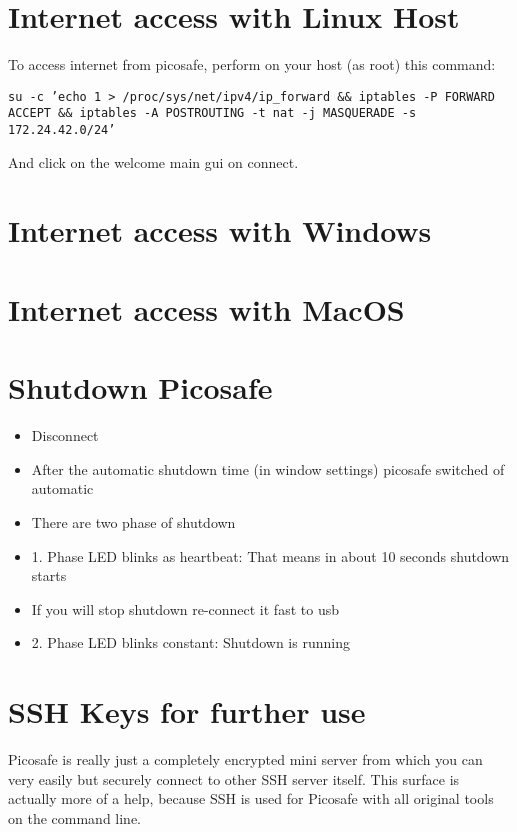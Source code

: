 \section{Internet access with Linux Host}

To access internet from picosafe, perform on your host (as root) this command:

\texttt{su -c 'echo 1 > /proc/sys/net/ipv4/ip\_forward \&\& iptables -P FORWARD ACCEPT \&\& iptables -A POSTROUTING -t nat -j MASQUERADE -s 172.24.42.0/24'}

And click on the welcome main gui on connect.

\section{Internet access with Windows}

\section{Internet access with MacOS}

\section{Shutdown Picosafe}
\begin{itemize}
\item Disconnect
\item After the automatic shutdown time (in window settings) picosafe switched of automatic
\item There are two phase of shutdown
\item 1. Phase LED blinks as heartbeat: That means in about 10 seconds shutdown starts
\item If you will stop shutdown re-connect it fast to usb
\item 2. Phase LED blinks constant: Shutdown is running
\end{itemize}



\section{SSH Keys for further use}

Picosafe is really just a completely encrypted mini server from which you can very easily but securely connect to other SSH server itself. This surface is actually more of a help, because SSH is used for Picosafe with all original tools on the command line. 

